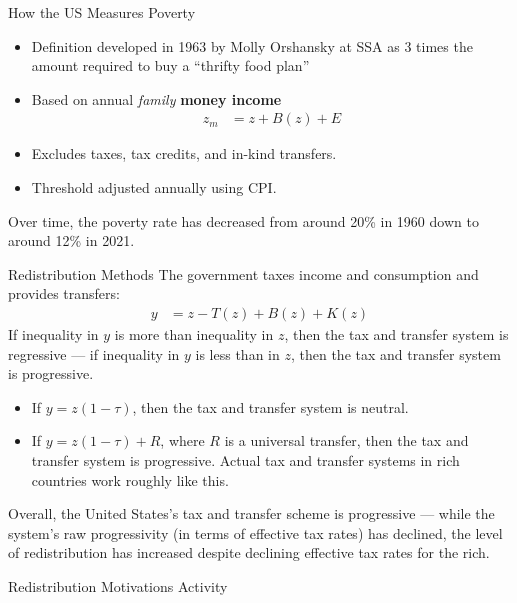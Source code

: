 \documentclass[10pt]{extarticle}
\begin{document}
  \begin{problem}{How the US Measures Poverty}
    \begin{itemize}
      \item Definition developed in 1963 by Molly Orshansky at SSA as 3 times the amount required to buy a ``thrifty food plan''
      \item Based on annual \textit{family} \textbf{money income}
        \begin{align*}
          z_{m} &= z + B(z) + E
        \end{align*}
      \item Excludes taxes, tax credits, and in-kind transfers.
      \item Threshold adjusted annually using CPI.
    \end{itemize}
    Over time, the poverty rate has decreased from around 20\% in 1960 down to around 12\% in 2021.
  \end{problem}
  \begin{problem}{Redistribution Methods}
    The government taxes income and consumption and provides transfers:
    \begin{align*}
      y &= z - T(z) + B(z) + K(z)
    \end{align*}
    If inequality in $y$ is more than inequality in $z$, then the tax and transfer system is regressive --- if inequality in $y$ is less than in $z$, then the tax and transfer system is progressive.
    \begin{itemize}
      \item If $y = z(1-\tau)$, then the tax and transfer system is neutral.
      \item If $y = z(1-\tau) + R$, where $R$ is a universal transfer, then the tax and transfer system is progressive. Actual tax and transfer systems in rich countries work roughly like this.
    \end{itemize}
    Overall, the United States's tax and transfer scheme is progressive --- while the system's raw progressivity (in terms of effective tax rates) has declined, the level of redistribution has increased despite declining effective tax rates for the rich.
  \end{problem}
  \begin{problem}{Redistribution Motivations Activity}
    \begin{tcbraster}[raster columns = 1,colframe = black!75!white,colback=white]
    \end{tcbraster}
  \end{problem}
\end{document}
